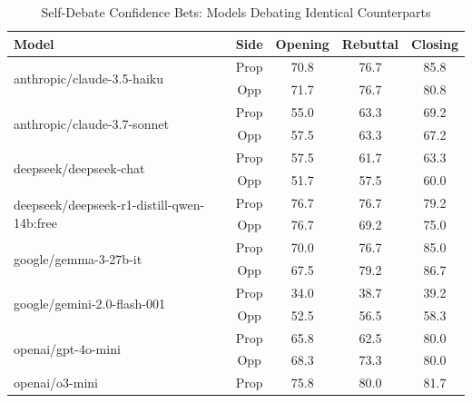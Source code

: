 \documentclass{article}
\begin{document}


\begin{table}[htbp]
  \centering
  \caption{Self-Debate Confidence Bets: Models Debating Identical Counterparts}
  \label{tab:self-debate}
  \begin{tabular}{l|c|ccc}
      \toprule
      \textbf{Model} & \textbf{Side} & \textbf{Opening} & \textbf{Rebuttal} & \textbf{Closing} \\
      \midrule
      \multirow{2}{*}{anthropic/claude-3.5-haiku} & Prop & 70.8 & 76.7 & 85.8 \\
       & Opp & 71.7 & 76.7 & 80.8 \\
      \midrule
      \multirow{2}{*}{anthropic/claude-3.7-sonnet} & Prop & 55.0 & 63.3 & 69.2 \\
       & Opp & 57.5 & 63.3 & 67.2 \\
      \midrule
      \multirow{2}{*}{deepseek/deepseek-chat} & Prop & 57.5 & 61.7 & 63.3 \\
       & Opp & 51.7 & 57.5 & 60.0 \\
      \midrule
      \multirow{2}{*}{deepseek/deepseek-r1-distill-qwen-14b:free} & Prop & 76.7 & 76.7 & 79.2 \\
       & Opp & 76.7 & 69.2 & 75.0 \\
      \midrule
      \multirow{2}{*}{google/gemma-3-27b-it} & Prop & 70.0 & 76.7 & 85.0 \\
       & Opp & 67.5 & 79.2 & 86.7 \\
      \midrule
      \multirow{2}{*}{google/gemini-2.0-flash-001} & Prop & 34.0 & 38.7 & 39.2 \\
       & Opp & 52.5 & 56.5 & 58.3 \\
      \midrule
      \multirow{2}{*}{openai/gpt-4o-mini} & Prop & 65.8 & 62.5 & 80.0 \\
       & Opp & 68.3 & 73.3 & 80.0 \\
      \midrule
      \multirow{2}{*}{openai/o3-mini} & Prop & 75.8 & 80.0 & 81.7 \\

\end{tabular}
\end{table}
\end{document}
